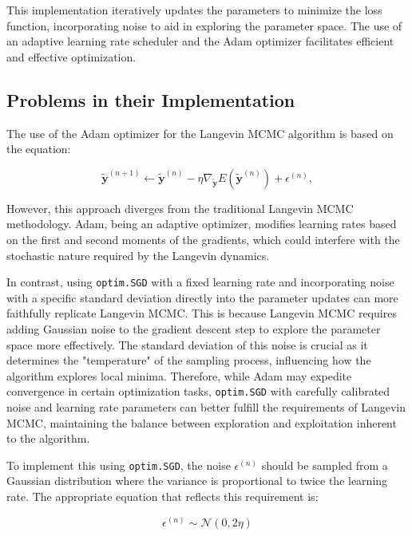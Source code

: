 \documentclass{article}
\begin{document}
This implementation iteratively updates the parameters to minimize the loss function, incorporating noise to aid in exploring the parameter space. The use of an adaptive learning rate scheduler and the Adam optimizer facilitates efficient and effective optimization.

\subsection{Problems in their Implementation}

The use of the Adam optimizer for the Langevin MCMC algorithm is based on the equation:

\begin{equation}
    \tilde{\boldsymbol{y}}^{(n+1)} \leftarrow \tilde{\boldsymbol{y}}^{(n)} - \eta \nabla_{\tilde{\boldsymbol{y}}} E(\tilde{\boldsymbol{y}}^{(n)}) + \epsilon^{(n)},
    \label{eq:langevin}
\end{equation}

However, this approach diverges from the traditional Langevin MCMC methodology. Adam, being an adaptive optimizer, modifies learning rates based on the first and second moments of the gradients, which could interfere with the stochastic nature required by the Langevin dynamics.

In contrast, using \texttt{optim.SGD} with a fixed learning rate and incorporating noise with a specific standard deviation directly into the parameter updates can more faithfully replicate Langevin MCMC. This is because Langevin MCMC requires adding Gaussian noise to the gradient descent step to explore the parameter space more effectively. The standard deviation of this noise is crucial as it determines the "temperature" of the sampling process, influencing how the algorithm explores local minima. Therefore, while Adam may expedite convergence in certain optimization tasks, \texttt{optim.SGD} with carefully calibrated noise and learning rate parameters can better fulfill the requirements of Langevin MCMC, maintaining the balance between exploration and exploitation inherent to the algorithm.

To implement this using \texttt{optim.SGD}, the noise \(\epsilon^{(n)}\) should be sampled from a Gaussian distribution where the variance is proportional to twice the learning rate. The appropriate equation that reflects this requirement is:

\begin{equation}
\epsilon^{(n)} \sim \mathcal{N}(0, 2\eta)
\end{equation}
\end{document}
